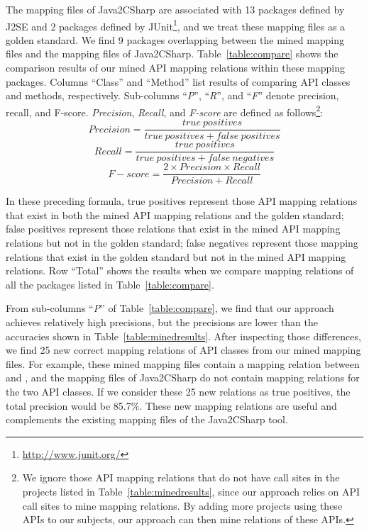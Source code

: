 The mapping files of Java2CSharp are associated with
13 packages defined by J2SE and 2 packages defined by
JUnit\footnote{\url{http://www.junit.org/}}, and we treat these
mapping files as a golden standard. We find 9 packages overlapping
between the mined mapping files and the mapping files of
Java2CSharp. Table~\ref{table:compare} shows the comparison
results of our mined API mapping relations within these mapping packages.
Columns ``Class'' and ``Method'' list results of comparing API
classes and methods, respectively. Sub-columns
``\emph{P}'', ``\emph{R}'', and ``\emph{F}'' denote precision,
recall, and F-score. \emph{Precision}, \emph{Recall}, and \emph{F-score} are defined as
follows\footnote{We ignore those API mapping relations that do
not have call sites in the projects listed in
Table~\ref{table:minedresults}, since our approach relies on
API call sites to mine mapping relations. By adding
more projects using these APIs to our subjects, our approach can then
mine relations of these APIs.}:\vspace*{-1ex}
\begin{equation}\label{eq-precison}
Precision=\frac{true\ positives}{true\ positives+false\ positives}
\end{equation}\vspace*{-2ex}
\begin{equation}\label{eq-recall}
Recall=\frac{true\ positives}{true\ positives+false\ negatives}
\end{equation}\vspace*{-2ex}
\begin{equation}\label{eq-fscore}
F\!-\!score=\frac{2\times Precision \times Recall}{Precision+Recall}
\end{equation}\vspace*{-2ex}



In these preceding formula, true positives represent those API mapping
relations that exist in both the mined API mapping relations and the golden
standard; false positives represent those relations that exist in the mined API
mapping relations but not in the golden standard; false negatives represent
those mapping relations that exist in the golden standard but not in
the mined API mapping relations. Row ``Total'' shows the results when we
compare mapping relations of all the packages listed in
Table~\ref{table:compare}.

From sub-columns ``\emph{P}'' of Table~\ref{table:compare}, we find
that our approach achieves relatively high precisions, but the
precisions are lower than the accuracies shown in
Table~\ref{table:minedresults}. After inspecting those differences,
we find 25 new correct mapping relations of API classes from our
mined mapping files. For example, these mined mapping files contain
a mapping relation between  and
, and the mapping files of Java2CSharp do not contain mapping relations for the two API classes. If we consider these 25 new relations as true positives,
the total precision would be 85.7\%. These new mapping relations are useful and
complements the existing mapping files of the Java2CSharp tool.

